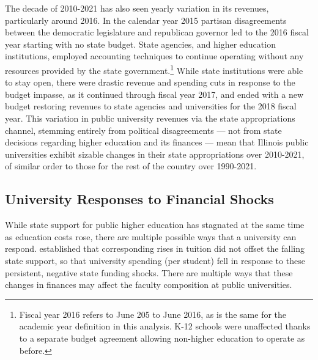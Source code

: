 \documentclass[notitlepage,12pt]{article}
\begin{document}
The decade of 2010-2021 has also seen yearly variation in its revenues, particularly around 2016.
In the calendar year 2015 partisan disagreements between the democratic legislature and republican governor led to the 2016 fiscal year starting with no state budget.
State agencies, and higher education institutions, employed accounting techniques to continue operating without any resources provided by the state government.\footnote{
    Fiscal year 2016 refers to June 205 to June 2016, as is the same for the academic year definition in this analysis. 
    K-12 schools were unaffected thanks to a separate budget agreement allowing non-higher education to operate as before.
}
While state institutions were able to stay open, there were drastic revenue and spending cuts in response to the budget impasse, as it continued through fiscal year 2017, and ended with a new budget restoring revenues to state agencies and universities for the 2018 fiscal year.
This variation in public university revenues via the state appropriations channel, stemming entirely from political disagreements --- not from state decisions regarding higher education and its finances \citep{young2020squandered} ---  mean that Illinois public universities exhibit sizable changes in their state appropriations over 2010-2021, of similar order to those for the rest of the country over 1990-2021.


\subsection{University Responses to Financial Shocks}
\label{sec:responses}

While state support for public higher education has stagnated at the same time as education costs rose, there are multiple possible ways that a university can respond.
\cite{NBERw23736} established that corresponding rises in tuition did not offset the falling state support, so that university spending (per student) fell in response to these persistent, negative state funding shocks.
There are multiple ways that these changes in finances may affect the faculty composition at public universities.
\end{document}
